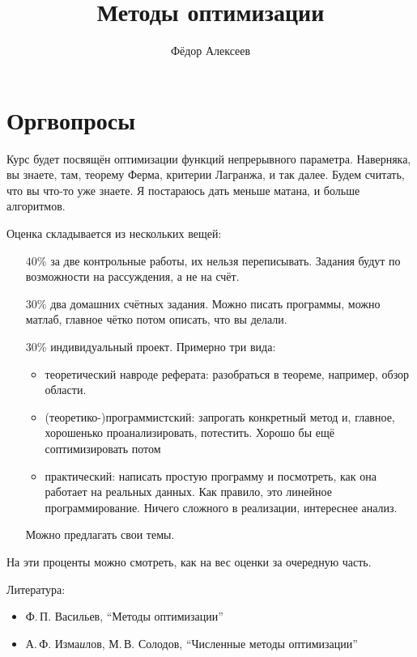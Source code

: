 



\title{Методы оптимизации}
\author{Фёдор Алексеев}

\maketitle
\gitlink{}
\tableofcontents\newpage{}




\section*{Оргвопросы}
Курс будет посвящён оптимизации функций непрерывного параметра.
Наверняка, вы знаете, там, теорему Ферма, критерии Лагранжа, и так далее.
Будем считать, что вы что-то уже знаете. Я постараюсь дать меньше матана, и больше алгоритмов.

Оценка складывается из нескольких вещей:
\begin{itemize}
  \item[$40\%$] за две контрольные работы, их нельзя переписывать.
    Задания будут по возможности на рассуждения, а не на счёт.
  \item[$30\%$] два домашних счётных задания. Можно писать программы, можно матлаб, главное чётко потом описать, что вы делали.
  \item[$30\%$] индивидуальный проект. Примерно три вида:
    \begin{itemize}
      \item теоретический навроде реферата: разобраться в теореме, например, обзор области.
      \item (теоретико-)программистский: запрогать конкретный метод и, главное, хорошенько проанализировать, потестить. Хорошо бы ещё соптимизировать потом
      \item практический: написать простую программу и посмотреть, как она работает на реальных данных. Как правило, это линейное программирование.
        Ничего сложного в реализации, интереснее анализ.
    \end{itemize}
    Можно предлагать свои темы.
\end{itemize}
На эти проценты можно смотреть, как на вес оценки за очередную часть.

Литература:
\begin{itemize}
  \item Ф.\,П. Васильев, ``Методы оптимизации''
  \item А.\,Ф. Изма{\em и}лов, М.\,В. Солодов, ``Численные методы оптимизации''
\end{itemize}


